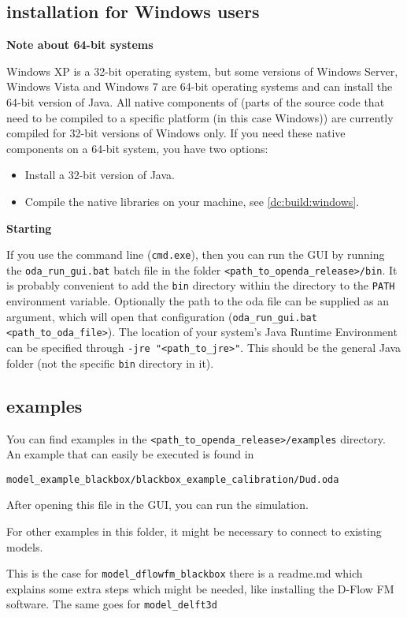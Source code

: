 \subsection{\oda installation for Windows users}
\textbf{Note about 64-bit systems}

Windows XP is a 32-bit operating system, but some versions of Windows Server, Windows Vista and Windows 7 are 64-bit operating systems and can install the 64-bit version of Java. All native components of \oda (parts of the source code that need to be compiled to a specific platform (in this case Windows)) are currently compiled for 32-bit versions of Windows only. If you need these native components on a 64-bit system, you have two options:
\begin{itemize}
\item Install a 32-bit version of Java.
\item Compile the native libraries on your machine, see \ref{dc:build:windows}.
\end{itemize}



\textbf{Starting \oda}

If you use the command line (\verb|cmd.exe|), then you can run the \oda GUI by running the \verb|oda_run_gui.bat| batch file in the folder \verb|<path_to_openda_release>/bin|. It is probably convenient to add the \verb|bin| directory within the \oda directory to the \verb|PATH| environment variable. Optionally the path to the oda file can be supplied as an argument, which will open that \oda configuration (\verb|oda_run_gui.bat <path_to_oda_file>|). The location of your system's Java Runtime Environment can be specified through \verb|-jre "<path_to_jre>"|. This should be the general Java folder (not the specific \verb|bin| directory in it).

\subsection{\oda examples}
You can find examples in the \verb|<path_to_openda_release>/examples| directory. An example that can easily be executed is found in

\verb|model_example_blackbox/blackbox_example_calibration/Dud.oda|

After opening this file in the GUI, you can run the simulation. 

For other examples in this folder, it might be necessary to connect to existing models. 

This is the case for \verb|model_dflowfm_blackbox| there is a readme.md which explains some extra steps which might be needed, like installing the D-Flow FM software.
The same goes for \verb|model_delft3d|


